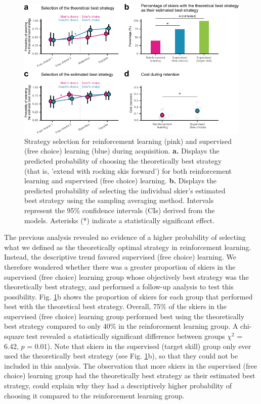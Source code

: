 \documentclass[pdflatex,sn-mathphys-num]{sn-jnl}%
\theoremstyle{thmstyleone}%
\theoremstyle{thmstyletwo}%
\theoremstyle{thmstylethree}%
\begin{document}
\begin{figure}[H]
\centering
\includegraphics{figures/figure_choice_estimated_4.pdf}
\caption{Strategy selection for reinforcement learning (pink) and supervised (free choice) learning (blue) during acquisition. \textbf{a.} Displays the predicted probability of choosing the theoretically best strategy (that is, 'extend with rocking skis forward') for both reinforcement learning and supervised (free choice) learning. \textbf{b.} Displays the predicted probability of selecting the individual skier's estimated best strategy using the sampling averaging method\cite{sutton_reinforcement_2018}. Intervals represent the 95\% confidence intervals (CIs) derived from the models. Asterisks (*) indicate a statistically significant effect.}\label{fig: choice_estimated}
\end{figure}

The previous analysis revealed no evidence of a higher probability of selecting what we defined as the theoretically optimal strategy in reinforcement learning. Instead, the descriptive trend favored supervised (free choice) learning. We therefore wondered whether there was a greater proportion of skiers in the supervised (free choice) learning group whose objectively best strategy was the theoretically best strategy, and performed a follow-up analysis to test this possibility. Fig. \ref{fig: choice_estimated}b shows the proportion of skiers for each group that performed best with the theoretical best strategy. Overall, 75\% of the skiers in the supervised (free choice) learning group performed best using the theoretically best strategy compared to only 40\% in the reinforcement learning group. A chi-square test revealed a statistically significant difference between groups $\chi^2$ = 6.42, $p$ = 0.01). Note that skiers in the supervised (target skill) group only ever used the theoretically best strategy (see Fig. \ref{fig: choice_estimated}b), so that they could not be included in this analysis. The observation that more skiers in the supervised (free choice) learning group had the theoretically best strategy as their estimated best strategy, could explain why they had a descriptively higher probability of choosing it compared to the reinforcement learning group.
\end{document}

